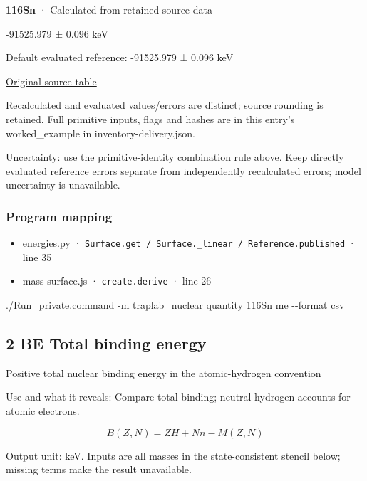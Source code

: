 \documentclass[
  11pt,
  letterpaper,
]{article}
\newenvironment{Shaded}{}{}
\newcommand{\AttributeTok}[1]{\textcolor[rgb]{0.49,0.56,0.16}{#1}}
\newcommand{\ExtensionTok}[1]{#1}
\newcommand{\NormalTok}[1]{#1}
\providecommand{\tightlist}{%
  \setlength{\itemsep}{0pt}\setlength{\parskip}{0pt}}
\begin{document}
\textbf{116Sn} · Calculated from retained source data

-91525.979 ± 0.096 keV

Default evaluated reference: -91525.979 ± 0.096 keV

\href{https://www-nds.iaea.org/amdc/ame2020/mass_1.mas20.txt}{Original
source table}

Recalculated and evaluated values/errors are distinct; source rounding
is retained. Full primitive inputs, flags and hashes are in this entry's
worked\_example in inventory-delivery.json.

Uncertainty: use the primitive-identity combination rule above. Keep
directly evaluated reference errors separate from independently
recalculated errors; model uncertainty is unavailable.

\subsubsection{Program mapping}\label{program-mapping}

\begin{itemize}
\tightlist
\item
  energies.py ·
  \texttt{Surface.get\ /\ Surface.\_linear\ /\ Reference.published} ·
  line 35
\item
  mass-surface.js · \texttt{create.derive} · line 26
\end{itemize}

\begin{Shaded}
\begin{Highlighting}[]
\ExtensionTok{./Run\_private.command} \AttributeTok{{-}m}\NormalTok{ traplab\_nuclear quantity 116Sn me }\AttributeTok{{-}{-}format}\NormalTok{ csv}
\end{Highlighting}
\end{Shaded}

\subsection{2 BE Total binding energy}\label{be-total-binding-energy}

Positive total nuclear binding energy in the atomic-hydrogen convention

Use and what it reveals: Compare total binding; neutral hydrogen
accounts for atomic electrons.

\[
B(Z,N)=Z H+N n-M(Z,N)
\]

Output unit: keV. Inputs are all masses in the state-consistent stencil
below; missing terms make the result unavailable.
\end{document}

